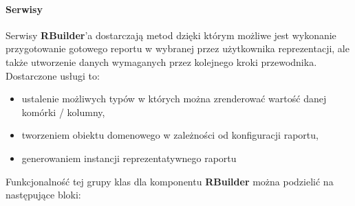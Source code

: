 			\paragraph{Serwisy}
			Serwisy \textbf{RBuilder}'a dostarczają metod dzięki którym możliwe jest wykonanie przygotowanie gotowego reportu
			w wybranej przez użytkownika reprezentacji, ale także utworzenie danych wymaganych przez kolejnego kroki przewodnika.
			Dostarczone usługi to:
			\begin{itemize}
				\item ustalenie możliwych typów w których można zrenderować wartość danej komórki / kolumny,
				\item tworzeniem obiektu domenowego w zależności od konfiguracji raportu,
				\item generowaniem instancji reprezentatywnego raportu
			\end{itemize}
			Funkcjonalność tej grupy klas dla komponentu \textbf{RBuilder} można podzielić na następujące bloki:
